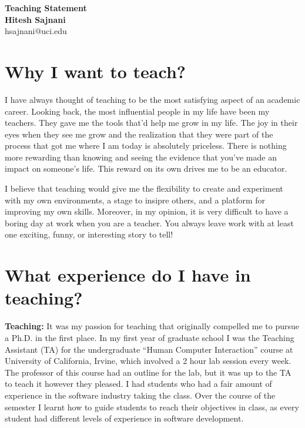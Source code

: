 \documentclass[a4paper]{article}
\begin{document}

\begin{center}
{\LARGE \textbf{Teaching Statement}} \\[.3in]
{\large  \textbf{Hitesh Sajnani}} \\
{\small hsajnani@uci.edu}
\end{center}
\pagestyle{fancy}
\lhead{\textcolor{black}{\it Hitesh Sajnani}}
\rhead{\textcolor{black}{\thepage/\pageref{LastPage}}}



\section*{Why I want to teach?}
I have always thought of teaching to be the most satisfying aspect of an academic career. Looking back, the most influential people in my life have been my teachers. 
They gave me the tools that'd help me grow in my life. The joy in their eyes when they see me grow and the realization that they were part of the process that got me where I am today is absolutely priceless.  
There is nothing more rewarding than knowing and seeing the evidence that you’ve made an impact on someone’s life. This reward on its own drives me to be an educator. 

I believe that teaching would give me the flexibility to create and experiment with my own environments, a stage to insipre others, and a platform for improving my own skills.  
Moreover, in my opinion, it is very difficult to have a boring day at work when you are a teacher. You always leave work with at least one exciting, funny, or interesting story to tell!

\section*{What experience do I have in teaching?}
\textbf{Teaching:} It was my passion for teaching that originally compelled me to pursue a Ph.D. in the first
place. In my first year of graduate school I was the Teaching Assistant (TA) for the undergraduate
“Human Computer Interaction” course at University of California, Irvine, which involved a 2 hour lab session
every week. The professor of this course had an outline for the lab, but it was up to the TA to teach it
however they pleased. I had students who had a fair amount of experience in the software industry taking the class. Over the
course of the semester I learnt how to guide students to reach their objectives in class, as every student had different levels of experience in software development. 
\end{document}

